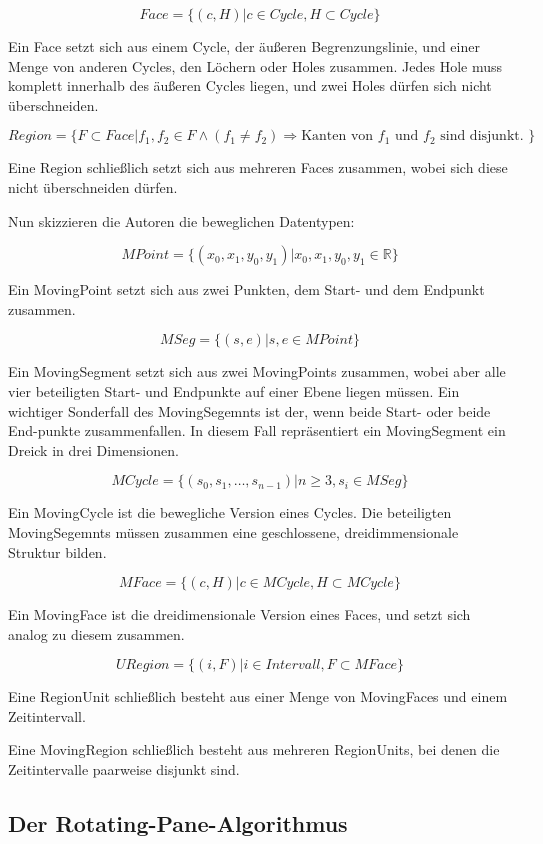 $$Face=\{(c,H)|c\in Cycle, H \subset Cycle\}$$

Ein Face setzt sich aus einem Cycle, der äußeren Begrenzungslinie, und einer Menge von anderen Cycles, den Löchern oder Holes zusammen. Jedes Hole muss komplett innerhalb des äußeren Cycles liegen, und zwei Holes dürfen sich nicht überschneiden. 

$$Region=\{F\subset Face|f_1,f_2\in F \wedge (f_1\neq f_2) \Rightarrow \text{Kanten von }f_1\text{ und } f_2 \text{ sind disjunkt. } \}$$

Eine Region schließlich setzt sich aus mehreren Faces zusammen, wobei sich diese nicht überschneiden dürfen. 

Nun skizzieren die Autoren die beweglichen Datentypen:

$$MPoint=\{(x_0,x_1,y_0,y_1)|x_0,x_1,y_0,y_1\in \mathbb{R}\}$$

Ein MovingPoint setzt sich aus zwei Punkten, dem Start- und dem Endpunkt zusammen.

$$MSeg=\{(s,e)|s,e\in MPoint\}$$

Ein MovingSegment setzt sich aus zwei MovingPoints zusammen, wobei aber alle vier beteiligten Start- und Endpunkte auf einer Ebene liegen müssen. Ein wichtiger Sonderfall des MovingSegemnts ist der, wenn beide Start- oder beide End-punkte zusammenfallen. In diesem Fall repräsentiert ein MovingSegment ein Dreick in drei Dimensionen.

$$MCycle=\{(s_0,s_1,\hdots ,s_{n-1})|n\geq3, s_i\in MSeg\}$$

Ein MovingCycle ist die bewegliche Version eines Cycles. Die beteiligten MovingSegemnts müssen zusammen eine geschlossene, dreidimmensionale Struktur bilden.

$$MFace=\{(c,H)|c\in MCycle, H\subset MCycle\}$$

Ein MovingFace ist die dreidimensionale Version eines Faces, und setzt sich analog zu diesem zusammen.

$$URegion=\{(i,F)|i\in Intervall, F\subset MFace\}$$

Eine RegionUnit schließlich besteht aus einer Menge von MovingFaces und einem Zeitintervall. 

Eine MovingRegion schließlich besteht aus mehreren RegionUnits, bei denen die Zeitintervalle paarweise disjunkt sind.

\subsection{Der Rotating-Pane-Algorithmus}

